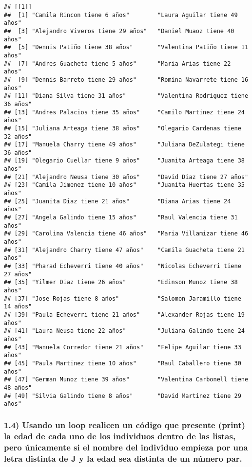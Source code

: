 \documentclass[
]{article}
\begin{document}
\begin{verbatim}
## [[1]]
##  [1] "Camila Rincon tiene 6 años"        "Laura Aguilar tiene 49 años"      
##  [3] "Alejandro Viveros tiene 29 años"   "Daniel Muaoz tiene 40 años"       
##  [5] "Dennis Patiño tiene 38 años"       "Valentina Patiño tiene 11 años"   
##  [7] "Andres Guacheta tiene 5 años"      "Maria Arias tiene 22 años"        
##  [9] "Dennis Barreto tiene 29 años"      "Romina Navarrete tiene 16 años"   
## [11] "Diana Silva tiene 31 años"         "Valentina Rodriguez tiene 36 años"
## [13] "Andres Palacios tiene 35 años"     "Camilo Martinez tiene 24 años"    
## [15] "Juliana Arteaga tiene 38 años"     "Olegario Cardenas tiene 32 años"  
## [17] "Manuela Charry tiene 49 años"      "Juliana DeZulategi tiene 36 años" 
## [19] "Olegario Cuellar tiene 9 años"     "Juanita Arteaga tiene 38 años"    
## [21] "Alejandro Neusa tiene 30 años"     "David Diaz tiene 27 años"         
## [23] "Camila Jimenez tiene 10 años"      "Juanita Huertas tiene 35 años"    
## [25] "Juanita Diaz tiene 21 años"        "Diana Arias tiene 24 años"        
## [27] "Angela Galindo tiene 15 años"      "Raul Valencia tiene 31 años"      
## [29] "Carolina Valencia tiene 46 años"   "Maria Villamizar tiene 46 años"   
## [31] "Alejandro Charry tiene 47 años"    "Camila Guacheta tiene 21 años"    
## [33] "Pharad Echeverri tiene 40 años"    "Nicolas Echeverri tiene 27 años"  
## [35] "Yilmer Diaz tiene 26 años"         "Edinson Munoz tiene 38 años"      
## [37] "Jose Rojas tiene 8 años"           "Salomon Jaramillo tiene 14 años"  
## [39] "Paula Echeverri tiene 21 años"     "Alexander Rojas tiene 19 años"    
## [41] "Laura Neusa tiene 22 años"         "Juliana Galindo tiene 24 años"    
## [43] "Manuela Corredor tiene 21 años"    "Felipe Aguilar tiene 33 años"     
## [45] "Paula Martinez tiene 10 años"      "Raul Caballero tiene 30 años"     
## [47] "German Munoz tiene 39 años"        "Valentina Carbonell tiene 48 años"
## [49] "Silvia Galindo tiene 8 años"       "David Martinez tiene 29 años"
\end{verbatim}

\hypertarget{usando-un-loop-realicen-un-cuxf3digo-que-presente-print-la-edad-de-cada-uno-de-los-individuos-dentro-de-las-listas-pero-uxfanicamente-si-el-nombre-del-individuo-empieza-por-una-letra-distinta-de-j-y-la-edad-sea-distinta-de-un-nuxfamero-par.}{%
\subsubsection{1.4) Usando un loop realicen un código que presente
(print) la edad de cada uno de los individuos dentro de las listas, pero
únicamente si el nombre del individuo empieza por una letra distinta de
J y la edad sea distinta de un número
par.}\label{usando-un-loop-realicen-un-cuxf3digo-que-presente-print-la-edad-de-cada-uno-de-los-individuos-dentro-de-las-listas-pero-uxfanicamente-si-el-nombre-del-individuo-empieza-por-una-letra-distinta-de-j-y-la-edad-sea-distinta-de-un-nuxfamero-par.}}
\end{document}
